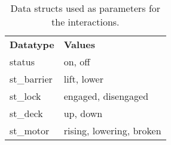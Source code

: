 \begin{table}[htb]%
\begin{tabular}{ll}
	\textbf{Datatype} & \textbf{Values}\\
	status & on, off\\
	st\_barrier & lift, lower\\
	st\_lock & engaged, disengaged\\
	st\_deck & up, down\\
	st\_motor & rising, lowering, broken\\
\end{tabular}
\caption{Data structs used as parameters for the interactions.}
\label{tab:types}
\end{table}
%

\newpage